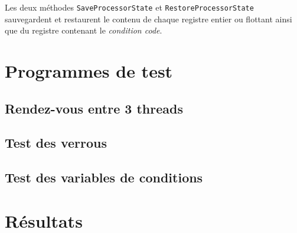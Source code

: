 \documentclass{article}
\def\fun#1{\texttt{#1}}
\begin{document}
Les deux méthodes \fun{SaveProcessorState} et \fun{RestoreProcessorState} sauvegardent et restaurent le contenu de chaque registre entier ou flottant ainsi que du registre contenant le \emph{condition code}.

\section{Programmes de test}
\subsection{Rendez-vous entre 3 threads}
\subsection{Test des verrous}
\subsection{Test des variables de conditions}

\section{Résultats}
\end{document}
